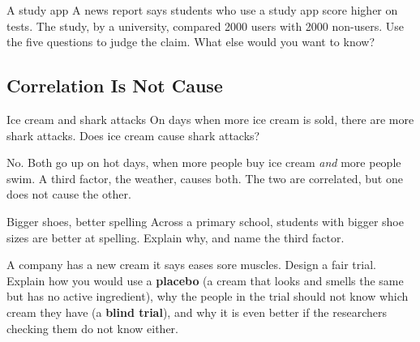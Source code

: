 \begin{wedo}{A study app}
A news report says students who use a study app score higher on tests. The study, by a university, compared 2000 users with 2000 non-users. Use the five questions to judge the claim. What else would you want to know?
\answerbox{5cm}
\end{wedo}

\subsection{Correlation Is Not Cause}\label{sub:a1.2}

\begin{workedex}{Ice cream and shark attacks}
On days when more ice cream is sold, there are more shark attacks. Does ice cream cause shark attacks?

\smallskip
No. Both go up on hot days, when more people buy ice cream \emph{and} more people swim. A third factor, the weather, causes both. The two are correlated, but one does not cause the other.
\end{workedex}

\begin{wedo}{Bigger shoes, better spelling}
Across a primary school, students with bigger shoe sizes are better at spelling. Explain why, and name the third factor.
\answerbox{4cm}
\end{wedo}

\label{prac:1}


\label{ext:1}

\task A company has a new cream it says eases sore muscles. Design a fair trial. Explain how you would use a \textbf{placebo} (a cream that looks and smells the same but has no active ingredient), why the people in the trial should not know which cream they have (a \textbf{blind trial}), and why it is even better if the researchers checking them do not know either.
\answerbox{9cm}

\clearpage

\setcounter{section}{1}\renewcommand{\lessonart}{4}
\label{sec:2}

